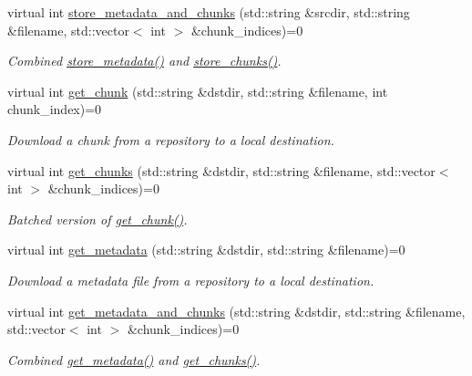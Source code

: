 \begin{DoxyCompactItemize}
virtual int \hyperlink{classStorage_a3c7a7ce8d22ed2793c83c9093c55218d}{store\-\_\-metadata\-\_\-and\-\_\-chunks} (std\-::string \&srcdir, std\-::string \&filename, std\-::vector$<$ int $>$ \&chunk\-\_\-indices)=0
\begin{DoxyCompactList}\small\item\em \-Combined \hyperlink{classStorage_a770cc3b02e9cd00176f3766d7f1cef86}{store\-\_\-metadata()} and \hyperlink{classStorage_a90bad676d3caaca1aa48243c512c7f98}{store\-\_\-chunks()}. \end{DoxyCompactList}\item 
virtual int \hyperlink{classStorage_a3e71fccbf04844423c233b0d836ef2eb}{get\-\_\-chunk} (std\-::string \&dstdir, std\-::string \&filename, int chunk\-\_\-index)=0
\begin{DoxyCompactList}\small\item\em \-Download a chunk from a repository to a local destination. \end{DoxyCompactList}\item 
virtual int \hyperlink{classStorage_a50be4d6b6a4208280e0ea462d71240da}{get\-\_\-chunks} (std\-::string \&dstdir, std\-::string \&filename, std\-::vector$<$ int $>$ \&chunk\-\_\-indices)=0
\begin{DoxyCompactList}\small\item\em \-Batched version of \hyperlink{classStorage_a3e71fccbf04844423c233b0d836ef2eb}{get\-\_\-chunk()}. \end{DoxyCompactList}\item 
virtual int \hyperlink{classStorage_ab5e0d5edea19961e934c7fcec9b392f7}{get\-\_\-metadata} (std\-::string \&dstdir, std\-::string \&filename)=0
\begin{DoxyCompactList}\small\item\em \-Download a metadata file from a repository to a local destination. \end{DoxyCompactList}\item 
virtual int \hyperlink{classStorage_a7f0b2f3cd74ad0faffa3b93147ecf777}{get\-\_\-metadata\-\_\-and\-\_\-chunks} (std\-::string \&dstdir, std\-::string \&filename, std\-::vector$<$ int $>$ \&chunk\-\_\-indices)=0
\begin{DoxyCompactList}\small\item\em \-Combined \hyperlink{classStorage_ab5e0d5edea19961e934c7fcec9b392f7}{get\-\_\-metadata()} and \hyperlink{classStorage_a50be4d6b6a4208280e0ea462d71240da}{get\-\_\-chunks()}. \end{DoxyCompactList}\item 

\end{DoxyCompactItemize}
